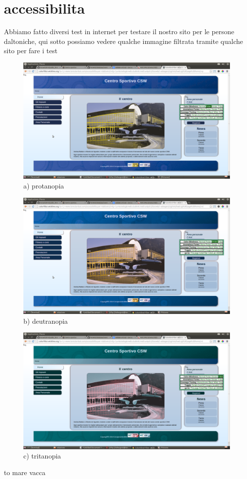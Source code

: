 \section{accessibilita}
Abbiamo fatto diversi test in internet per testare il nostro sito per le persone daltoniche, qui sotto possiamo vedere qualche immagine filtrata tramite qualche sito per fare i test \newline
\begin{figure}
	{\centering \includegraphics[height=0.3\textwidth]{images/protan.png} 
	\caption{a) protanopia}}
\end{figure}
\begin{figure}
	{\centering \includegraphics[height=0.3\textwidth]{images/deutran.png} 
	\caption{b) deutranopia} }
\end{figure}
\begin{figure}
	{\centering \includegraphics[height=0.3\textwidth]{images/tritan.png} 
	\caption{c) tritanopia}}
\end{figure}

to mare vacca
